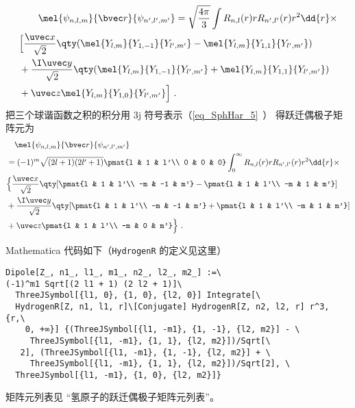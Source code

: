 \begin{equation}
\begin{aligned}
&\qquad \mel{\psi_{n,l,m}}{\bvec r}{\psi_{n',l',m'}}
= \sqrt{\frac{4\pi}{3}}\int R_{n,l}(r) r R_{n',l'}(r) r^2 \dd{r}\times\\
&\Big[\frac{\uvec x}{\sqrt 2} \qty(\mel{Y_{l,m}}{Y_{1,-1}}{Y_{l',m'}} - \mel{Y_{l,m}}{Y_{1,1}}{Y_{l',m'}})\\
&+ \frac{\I \uvec y}{\sqrt 2} \qty(\mel{Y_{l,m}}{Y_{1,-1}}{Y_{l',m'}} + \mel{Y_{l,m}}{Y_{1,1}}{Y_{l',m'}})\\
&+ \uvec z\mel{Y_{l,m}}{Y_{1,0}}{Y_{l',m'}}\Big]~.
\end{aligned}
\end{equation}
把三个球谐函数之积的积分用 3j 符号表示（\autoref{eq_SphHar_5}~） 得跃迁偶极子矩阵元为
\begin{equation}
\begin{aligned}
&\quad\mel{\psi_{n,l,m}}{\bvec r}{\psi_{n',l',m'}}\\
&= (-1)^m\sqrt{(2l+1)(2l'+1)} \pmat{l & 1 & l'\\ 0 & 0 & 0} \int_0^\infty R_{n,l}(r) r R_{n',l'}(r) r^2 \dd{r}\times\\
&\Big\{\frac{\uvec x}{\sqrt 2} \qty[\pmat{l & 1 & l'\\ -m & -1 & m'} - \pmat{l & 1 & l'\\ -m & 1 & m'}]\\
&+ \frac{\I \uvec y}{\sqrt 2} \qty[\pmat{l & 1 & l'\\ -m & -1 & m'} + \pmat{l & 1 & l'\\ -m & 1 & m'}]\\
&+  \uvec z \pmat{l & 1 & l'\\ -m & 0 & m'}\Big\}~.
\end{aligned}
\end{equation}

Mathematica 代码如下（\verb|HydrogenR| 的定义见这里）
\begin{lstlisting}[language=mma]
Dipole[Z_, n1_, l1_, m1_, n2_, l2_, m2_] :=\
(-1)^m1 Sqrt[(2 l1 + 1) (2 l2 + 1)]\
  ThreeJSymbol[{l1, 0}, {1, 0}, {l2, 0}] Integrate[\
  HydrogenR[Z, n1, l1, r]\[Conjugate] HydrogenR[Z, n2, l2, r] r^3, {r,\
    0, +∞}] {(ThreeJSymbol[{l1, -m1}, {1, -1}, {l2, m2}] - \
     ThreeJSymbol[{l1, -m1}, {1, 1}, {l2, m2}])/Sqrt[\
   2], (ThreeJSymbol[{l1, -m1}, {1, -1}, {l2, m2}] + \
     ThreeJSymbol[{l1, -m1}, {1, 1}, {l2, m2}])/Sqrt[2], \
  ThreeJSymbol[{l1, -m1}, {1, 0}, {l2, m2}]}
\end{lstlisting}
矩阵元列表见 “氢原子的跃迁偶极子矩阵元列表\upref{HDipM}”。

